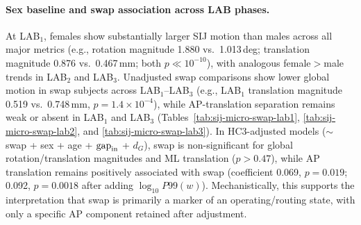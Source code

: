 \documentclass[11pt]{article}
\newcommand{\StdTableFont}{\footnotesize}
\newcommand{\StdTableInput}[1]{%
  \begingroup
  \setlength{\tabcolsep}{4pt}%
  \resizebox{\linewidth}{!}{}%
  \endgroup
}
\begin{document}
\paragraph{Sex baseline and swap association across LAB phases.}
At LAB$_1$, females show substantially larger SIJ motion than males across all major metrics
(e.g., rotation magnitude 1.880 vs.\ 1.013\,deg; translation magnitude 0.876 vs.\ 0.467\,mm; both $p\ll10^{-10}$), with analogous female$>$male trends in LAB$_2$ and LAB$_3$.
Unadjusted swap comparisons show lower global motion in swap subjects across LAB$_1$--LAB$_3$ (e.g., LAB$_1$ translation magnitude 0.519 vs.\ 0.748\,mm, $p=1.4\times10^{-4}$), while AP-translation separation remains weak or absent in LAB$_1$ and LAB$_3$ (Tables~\ref{tab:sij-micro-swap-lab1}, \ref{tab:sij-micro-swap-lab2}, and \ref{tab:sij-micro-swap-lab3}).
In HC3-adjusted models ($\sim$ swap + sex + age + $\mathrm{gap}_{\rm in}$ + $d_G$), swap is non-significant for global rotation/translation magnitudes and ML translation ($p>0.47$), while AP translation remains positively associated with swap (coefficient 0.069, $p=0.019$; 0.092, $p=0.0018$ after adding $\log_{10}P99(w)$).
Mechanistically, this supports the interpretation that swap is primarily a marker of an operating/routing state, with only a specific AP component retained after adjustment.

\begin{table}[!tbp]
\centering
\caption{SIJ micromotion under LAB\textsubscript{1}: swap vs.\ no-swap comparisons (Mann--Whitney).}
\label{tab:sij-micro-swap-lab1}
\StdTableFont
\StdTableInput{../../analysis_outputs/sij_micromotion/sij_micromotion_swap_tests_LAB_phase1.tex}
\end{table}

\begin{table}[!tbp]
\centering
\caption{SIJ micromotion under LAB\textsubscript{2}: swap vs.\ no-swap comparisons (Mann--Whitney).}
\label{tab:sij-micro-swap-lab2}
\StdTableFont
\StdTableInput{../../analysis_outputs/sij_micromotion/sij_micromotion_swap_tests_LAB_phase2.tex}
\end{table}

\begin{table}[!tbp]
\centering
\caption{SIJ micromotion under LAB\textsubscript{3}: swap vs.\ no-swap comparisons (Mann--Whitney).}
\label{tab:sij-micro-swap-lab3}
\StdTableFont
\StdTableInput{../../analysis_outputs/sij_micromotion/sij_micromotion_swap_tests_LAB_phase3.tex}
\end{table}
\end{document}
